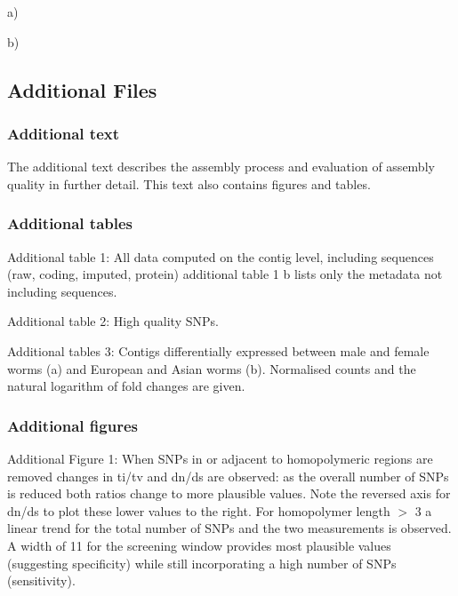 \documentclass[10pt]{bmc_article}
\newenvironment{bmcformat}{\begin{raggedright}\baselineskip20pt\sloppy\setboolean{publ}{false}}{\end{raggedright}\baselineskip20pt\sloppy}
\begin{document}
\begin{bmcformat}
a)\\


\newpage

b)\\


\normalsize


\subsection*{Additional Files}

\subsubsection*{Additional text}
The additional text describes the assembly process and evaluation of
assembly quality in further detail. This text also contains figures
and tables.

\subsubsection*{Additional tables}

Additional table 1: 
All data computed on the contig level, including sequences (raw,
coding, imputed, protein) additional table 1 b lists only the metadata
not including sequences.

Additional table 2:
High quality SNPs.

Additional tables 3: 
Contigs differentially expressed between male and
female worms (a) and European and Asian worms (b). Normalised counts
and the natural logarithm of fold changes are given.

\subsubsection*{Additional figures}

Additional Figure 1: 
When SNPs in or adjacent to homopolymeric
regions are removed changes in ti/tv and dn/ds are observed: as the
overall number of SNPs is reduced both ratios change to more plausible
values. Note the reversed axis for dn/ds to plot these lower values to
the right. For homopolymer length $>$ 3 a linear trend for the total
number of SNPs and the two measurements is observed. A width of 11 for
the screening window provides most plausible values (suggesting
specificity) while still incorporating a high number of SNPs
(sensitivity).


\end{bmcformat}
\end{document}
